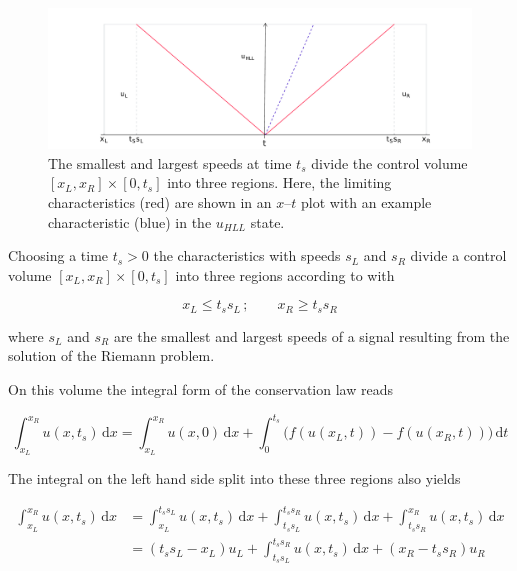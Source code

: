 \begin{figure}[ht]
 \centering
 \includegraphics[width=\textwidth]{Figures/hll_regions}
 \captionsetup{justification=justified,singlelinecheck=false,width=\linewidth}
 \decoRule
 \caption[Volume partition in HLL]{The smallest and largest speeds at time $t_{s}$ divide the control volume $[x_{L}, x_{R}]\times[0, t_{s}]$ into three regions.
                                  Here, the limiting characteristics (red) are shown in an $x$--$t$ plot with an example characteristic (blue) in the $u_{HLL}$ state.}
 \label{fig:HLL_regions}
\end{figure}

Choosing a time $t_{s}>0$ the characteristics with speeds $s_{L}$ and $s_{R}$ divide a control volume $[x_{L}, x_{R}]\times[0, t_{s}]$ into three regions according to  with

\begin{equation}
  x_{L} \leq t_{s}s_{L}\,;\qquad x_{R} \geq t_{s}s_{R}
\end{equation}

where $s_{L}$ and $s_{R}$ are the smallest and largest speeds of a signal resulting from the solution of the Riemann problem.

On this volume the integral form of the conservation law reads

\begin{equation}
  \int_{x_{L}}^{x_{R}} u(x, t_{s})\,\mathrm{d}x = \int_{x_{L}}^{x_{R}} u(x, 0)\,\mathrm{d}x + \int_{0}^{t_{s}} \big(f(u(x_{L}, t)) - f(u(x_{R}, t))\big)\,\mathrm{d}t
\label{eq:Integral_form}
\end{equation}

The integral on the left hand side split into these three regions also yields

\begin{align}
  \int_{x_{L}}^{x_{R}} u(x, t_{s})\,\mathrm{d}x &= \int_{x_{L}}^{t_{s}s_{L}} u(x, t_{s})\,\mathrm{d}x + \int_{t_{s}s_{L}}^{t_{s}s_{R}} u(x, t_{s})\,\mathrm{d}x + \int_{t_{s}s_{R}}^{x_{R}} u(x, t_{s})\,\mathrm{d}x \\
  &= (t_{s}s_{L} - x_{L}) u_{L} + \int_{t_{s}s_{L}}^{t_{s}s_{R}} u(x, t_{s})\,\mathrm{d}x + (x_{R} - t_{s}s_{R}) u_{R}
\label{eq:Integral_split}
\end{align}

